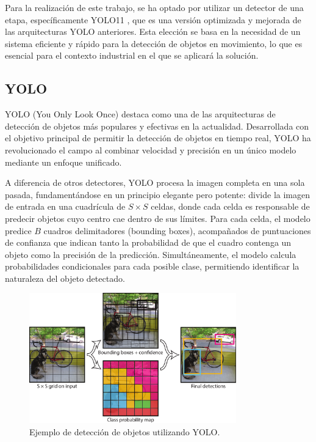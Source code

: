 \documentclass[11pt,spanish,listoffigures,listoftables]{tfgetsinf}
\begin{document}
Para la realización de este trabajo, se ha optado por utilizar un detector de una etapa, específicamente YOLO11 \cite{yolo11_ultralytics}, que es una versión optimizada y mejorada de las arquitecturas YOLO anteriores. Esta elección se basa en la necesidad de un sistema eficiente y rápido para la detección de objetos en movimiento, lo que es esencial para el contexto industrial en el que se aplicará la solución.
\subsection{YOLO}

YOLO (You Only Look Once) destaca como una de las arquitecturas de detección de objetos más populares y efectivas en la actualidad. Desarrollada con el objetivo principal de permitir la detección de objetos en tiempo real, YOLO ha revolucionado el campo al combinar velocidad y precisión en un único modelo mediante un enfoque unificado.

A diferencia de otros detectores, YOLO procesa la imagen completa en una sola pasada, fundamentándose en un principio elegante pero potente: divide la imagen de entrada en una cuadrícula de $S \times S$ celdas, donde cada celda es responsable de predecir objetos cuyo centro cae dentro de sus límites. Para cada celda, el modelo predice $B$ cuadros delimitadores (bounding boxes), acompañados de puntuaciones de confianza que indican tanto la probabilidad de que el cuadro contenga un objeto como la precisión de la predicción. Simultáneamente, el modelo calcula probabilidades condicionales para cada posible clase, permitiendo identificar la naturaleza del objeto detectado.

\begin{figure}[H]
   \centering
   \includegraphics[width=0.8\textwidth]{images/estado_del_arte/yolo_detections_example.png}
   \caption{Ejemplo de detección de objetos utilizando YOLO.}
   \label{fig:yolo_detections_example}
\end{figure}
\end{document}
